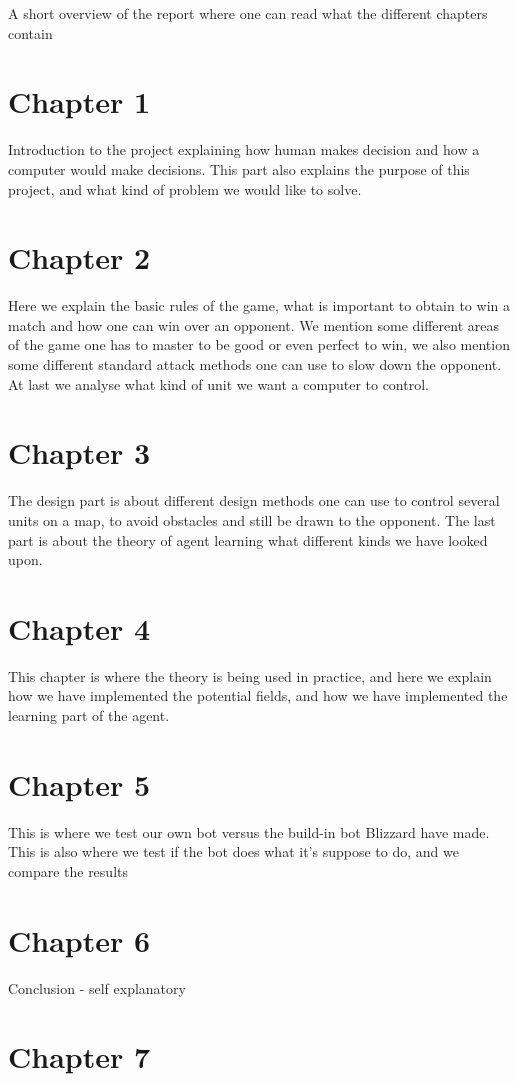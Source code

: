 A short overview of the report where one can read what the different chapters contain

\section*{Chapter 1}
Introduction to the project explaining how human makes decision and how a computer would make decisions. This part also explains the purpose of this project, and what kind of problem we would like to solve.
\section*{Chapter 2}
Here we explain the basic rules of the game, what is important to obtain to win a match and how one can win over an opponent. We mention some different areas of the game one has to master to be good or even perfect to win, we also mention some different standard attack methods one can use to slow down the opponent. At last we analyse what kind of unit we want a computer to control.
\section*{Chapter 3}
The design part is about different design methods one can use to control several units on a map, to avoid obstacles and still be drawn to the opponent. The last part is about the theory of agent learning what different kinds we have looked upon.
\section*{Chapter 4}
This chapter is where the theory is being used in practice, and here we explain how we have implemented the potential fields, and how we have implemented the learning part of the agent.
\section*{Chapter 5}
This is where we test our own bot versus the build-in bot Blizzard have made. This is also where we test if the bot does what it's suppose to do, and we compare the results %
\section*{Chapter 6}
Conclusion - self explanatory %
\section*{Chapter 7}